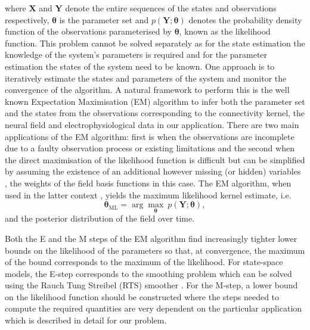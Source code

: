 \documentclass[review,authoryear,3p]{elsarticle}
\begin{document}
where $\mathbf X$ and $\mathbf Y$ denote the entire sequences of the states and observations respectively, $\boldsymbol\theta$ is the parameter set and $p(\mathbf Y;\boldsymbol\theta)$ denotes the probability density function of the observations parameterised  by $\boldsymbol\theta$, known as the likelihood function. This problem cannot be solved separately as for the state estimation the knowledge of the system's parameters is required and for the parameter estimation the states of the system need to be known. One approach is to iteratively estimate the states and parameters of the system and monitor the convergence of the algorithm. A natural framework to perform this is the well known Expectation Maximisation (EM) algorithm \cite{Dempster1977,Shumway2000} to infer both the parameter set and the states from the observations corresponding to the connectivity kernel, the neural field and electrophysiological data in our application. There are two main applications of the EM algorithm:  first is when the observations are incomplete due to a faulty observation process or existing limitations and the second  when the direct maximisation of the likelihood function is difficult but can be simplified by assuming the existence of an additional however missing (or hidden) variables \cite{Bilmes1998}, the weights of the field basis functions in this case. The EM algorithm, when used in the latter context \cite{Dewar2009}, yields the maximum likelihood kernel estimate, i.e.
\begin{equation}
	\boldsymbol\theta_{\text{ML}}=\arg\max_{\boldsymbol\theta}~p(\mathbf Y;\boldsymbol\theta),
 \end{equation}   
and the posterior distribution of the field over time.

Both the E and the M steps of the EM algorithm find increasingly tighter lower bounds on the likelihood of the parameters so that, at convergence, the maximum of the bound corresponds to the maximum of the likelihood. For state-space models, the E-step corresponds to the smoothing problem which can be solved using the Rauch Tung Streibel (RTS) smoother \cite{RAUCH1965}. For the M-step, a lower bound on the likelihood function should be constructed where the steps needed
to compute the required quantities are very dependent on the particular application which is described in detail for our problem. 
\end{document}
